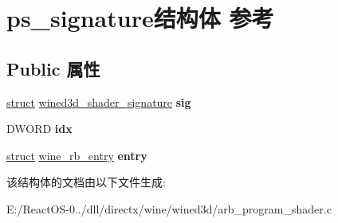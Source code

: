 \hypertarget{structps__signature}{}\section{ps\+\_\+signature结构体 参考}
\label{structps__signature}
\subsection*{Public 属性}
\begin{DoxyCompactItemize}
\item 
\mbox{\label{structps__signature_aa18ebbeade2c5731806903f453ca5707}} 
\hyperlink{interfacestruct}{struct} \hyperlink{structwined3d__shader__signature}{wined3d\+\_\+shader\+\_\+signature} {\bfseries sig}
\item 
\mbox{\label{structps__signature_a50a73398fa5e4be28baa1595a312c12e}} 
D\+W\+O\+RD {\bfseries idx}
\item 
\mbox{\label{structps__signature_a40e10f453435254e3b4bdf5de2c33017}} 
\hyperlink{interfacestruct}{struct} \hyperlink{structwine__rb__entry}{wine\+\_\+rb\+\_\+entry} {\bfseries entry}
\end{DoxyCompactItemize}


该结构体的文档由以下文件生成\+:\begin{DoxyCompactItemize}
\item 
E\+:/\+React\+O\+S-\/0../dll/directx/wine/wined3d/arb\+\_\+program\+\_\+shader.\+c\end{DoxyCompactItemize}

